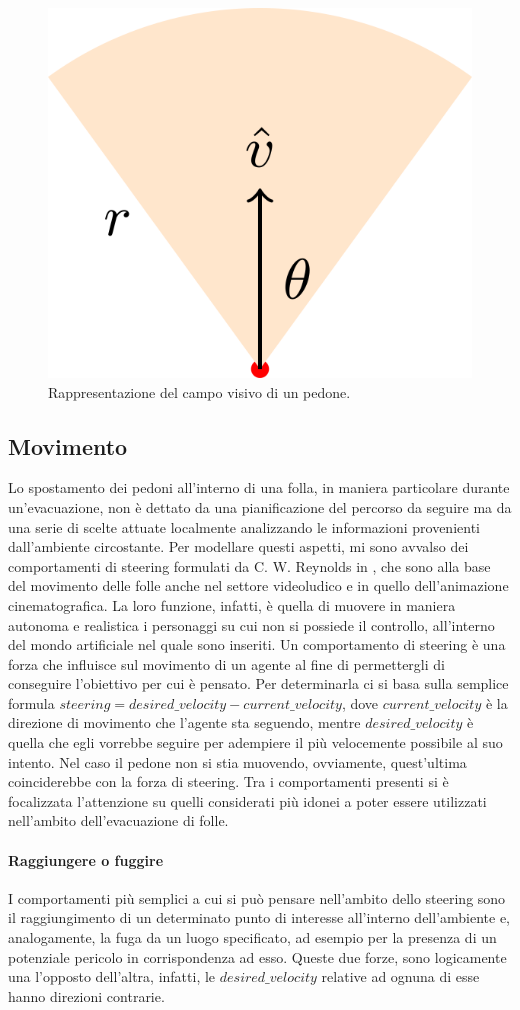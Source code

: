 \begin{figure}[ht]
  \centering
  \includegraphics[width=0.3\linewidth]{immagini/fov.png}
  \caption{Rappresentazione del campo visivo di un pedone.}
  \label{fig:fov}
\end{figure}

\subsection{Movimento}
Lo spostamento dei pedoni all'interno di una folla, in maniera particolare durante un'evacuazione, non è dettato da una pianificazione del percorso da seguire ma da una serie di scelte attuate localmente analizzando le informazioni provenienti dall'ambiente circostante. Per modellare questi aspetti, mi sono avvalso dei comportamenti di steering formulati da C. W. Reynolds in \cite{Reynolds1999}, che sono alla base del movimento delle folle anche nel settore videoludico e in quello dell'animazione cinematografica. La loro funzione, infatti, è quella di muovere in maniera autonoma e realistica i personaggi su cui non si possiede il controllo, all'interno del mondo artificiale nel quale sono inseriti. \newline
Un comportamento di steering è una forza che influisce sul movimento di un agente al fine di permettergli di conseguire l'obiettivo per cui è pensato. Per determinarla ci si basa sulla semplice formula $steering = desired\_velocity - current\_velocity$, dove $current\_velocity$ è la direzione di movimento che l'agente sta seguendo, mentre $desired\_velocity$ è quella che egli vorrebbe seguire per adempiere il più velocemente possibile al suo intento. Nel caso il pedone non si stia muovendo, ovviamente, quest'ultima coinciderebbe con la forza di steering. \newline
Tra i comportamenti presenti si è focalizzata l'attenzione su quelli considerati più idonei a poter essere utilizzati nell'ambito dell'evacuazione di folle.

\paragraph{Raggiungere o fuggire}
I comportamenti più semplici a cui si può pensare nell'ambito dello steering sono il raggiungimento di un determinato punto di interesse all'interno dell'ambiente e, analogamente, la fuga da un luogo specificato, ad esempio per la presenza di un potenziale pericolo in corrispondenza ad esso.
Queste due forze, sono logicamente una l'opposto dell'altra, infatti, le $desired\_velocity$ relative ad ognuna di esse hanno direzioni contrarie.

